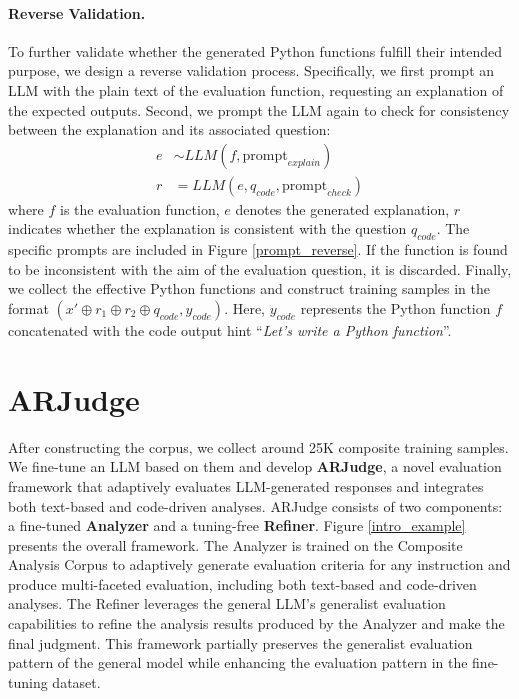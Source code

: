 \paragraph{Reverse Validation.}
To further validate whether the generated Python functions fulfill their intended purpose, we design a reverse validation process. Specifically, we first prompt an LLM with the plain text of the evaluation function, requesting an explanation of the expected outputs. Second, we prompt the LLM again to check for consistency between the explanation and its associated question:
\begin{equation}
\begin{aligned}
e &\sim LLM(f, \text{prompt}_{explain}) \\
r &= LLM(e, q_{code}, \text{prompt}_{check})
\end{aligned}
\end{equation}
where $f$ is the evaluation function, $e$ denotes the generated explanation, $r$ indicates whether the explanation is consistent with the question $q_{code}$. The specific prompts are included in Figure \ref{prompt_reverse}. If the function is found to be inconsistent with the aim of the evaluation question, it is discarded. Finally, we collect the effective Python functions and construct training samples in the format $(x' \oplus r_1 \oplus r_2 \oplus q_{code}, y_{code})$. Here, $y_{code}$ represents the Python function $f$ concatenated with the code output hint ``\textit{Let's write a Python function}''. 

\section{ARJudge}
After constructing the corpus, we collect around 25K composite training samples. We fine-tune an LLM based on them and develop \textbf{ARJudge}, a novel evaluation framework that adaptively evaluates LLM-generated responses and integrates both text-based and code-driven analyses. ARJudge consists of two components: a fine-tuned \textbf{Analyzer} and a tuning-free \textbf{Refiner}. Figure \ref{intro_example} presents the overall framework. The Analyzer is trained on the Composite Analysis Corpus to adaptively generate evaluation criteria for any instruction and produce multi-faceted evaluation, including both text-based and code-driven analyses. The Refiner leverages the general LLM's generalist evaluation capabilities to refine the analysis results produced by the Analyzer and make the final judgment. This framework partially preserves the generalist evaluation pattern of the general model while enhancing the evaluation pattern in the fine-tuning dataset.

